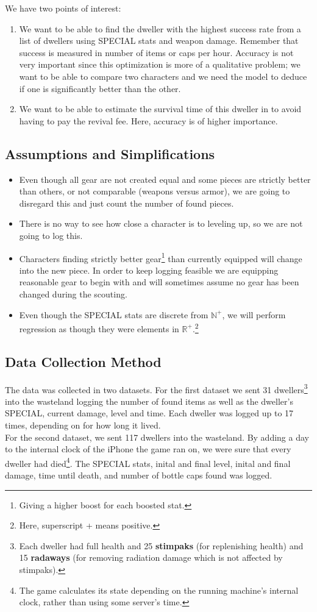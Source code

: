 We have two points of interest:
\begin{enumerate}
\item We want to be able to find the dweller with the highest success rate from a list of dwellers using SPECIAL stats and weapon damage. Remember that success is measured in number of items or caps per hour. Accuracy is not very important since this optimization is more of a qualitative problem; we want to be able to compare two characters and we need the model to deduce if one is significantly better than the other. 
\item We want to be able to estimate the survival time of this dweller in to avoid having to pay the revival fee. Here, accuracy is of higher importance.
\end{enumerate}

\subsection{Assumptions and Simplifications}
\begin{itemize}
\item Even though all gear are not created equal and some pieces are strictly better than others, or not comparable (weapons versus armor), we are going to disregard this and just count the number of found pieces.
\item There is no way to see how close a character is to leveling up, so we are not going to log this.
\item Characters finding strictly better gear\footnote{Giving a higher boost for each boosted stat.} than currently equipped will change into the new piece. In order to keep logging feasible we are equipping reasonable gear to begin with and will sometimes assume no gear has been changed during the scouting.
\item Even though the SPECIAL stats are discrete from $\mathbb{N}^+$, we will perform regression as though they were elements in $\mathbb{R}^+$.\footnote{Here, superscript + means positive.}
\end{itemize}

\subsection{Data Collection Method}
The data was collected in two datasets. For the first dataset we sent 31 dwellers\footnote{Each dweller had full health and 25 \textbf{stimpaks} (for replenishing health) and 15 \textbf{radaways} (for removing radiation damage which is not affected by stimpaks).} into the wasteland logging the number of found items as well as the dweller's SPECIAL, current damage, level and time. Each dweller was logged up to 17 times, depending on for how long it lived.\\

For the second dataset, we sent 117 dwellers into the wasteland. By adding a day to the internal clock of the iPhone the game ran on, we were sure that every dweller had died\footnote{The game calculates its state depending on the running machine's internal clock, rather than using some server's time.}. The SPECIAL stats, inital and final level, inital and final damage, time until death, and number of bottle caps found was logged.